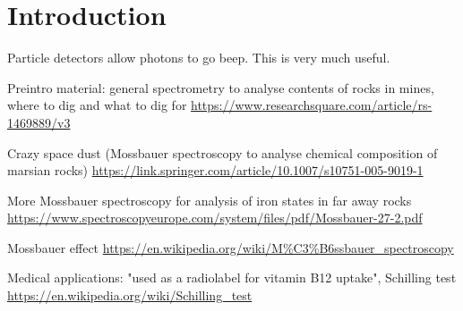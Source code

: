 \section{Introduction}
Particle detectors allow photons to go beep.
This is very much useful.

Preintro material: general spectrometry to analyse contents of rocks in mines, where to dig and what to dig for \url{https://www.researchsquare.com/article/rs-1469889/v3} \cite{ramadhany_assessment_2022}

Crazy space dust (Mossbauer spectroscopy to analyse chemical composition of marsian rocks) \url{https://link.springer.com/article/10.1007/s10751-005-9019-1}

More Mossbauer spectroscopy for analysis of iron states in far away rocks \url{https://www.spectroscopyeurope.com/system/files/pdf/Mossbauer-27-2.pdf}

Mossbauer effect \url{https://en.wikipedia.org/wiki/M%C3%B6ssbauer_spectroscopy}

Medical applications: "used as a radiolabel for vitamin B12 uptake", Schilling test \url{https://en.wikipedia.org/wiki/Schilling_test}